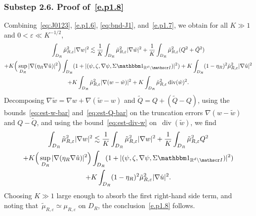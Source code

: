 \documentclass[JEP,XML,SOM,Unicode,published]{cedram}
\let\mathcal\mathscr
\let\mathds\mathbbm
\theoremstyle{plain}
\theoremstyle{definition}
\newcommand{\e}{\varepsilon}
\newcommand{\R}{\mathbb R}
\newcommand{\Ic}{\mathcal I}
\newcommand{\Div}{{\operatorname{div}}}
\newcommand{\substep}[1]{\subsubsection*{Substep #1}}
\begin{document}
\substep{2.6. Proof of~\eqref{e.p1.8}}
Combining~\eqref{eq:J0123}, \eqref{e.p1.6}, \eqref{eq:bnd-J1}, and~\eqref{e.p1.7}, we obtain for all $K\gg1$ and $0<\e\ll K^{-1/2}$,
\begin{multline*}
\int_{D_R} \tilde \mu_{R,\e}^2|\nabla w|^2
\lesssim \frac1K\int_{D_R}\tilde\mu_{R,\e}^2|\nabla\tilde w|^2
+\frac1K\int_{D_R}\tilde\mu_{R,\e}^2( Q^2+\tilde Q^2)\\
+K\Big(\sup_{D_R}|\nabla(\eta_R\nabla\hat u)|^2\Big)\int_{D_R}(1+|(\psi,\zeta,\nabla\psi,\Sigma\mathds1_{\R^d\setminus\Ic})|^2)
+K\int_{D_R}(1-\eta_R)^2\tilde\mu_{R,\e}^2|\nabla\hat u|^2\\
+K\int_{D_R} \tilde \mu_{R,\e}^2|\nabla(w-\tilde w)|^2
+K\int_{D_R} \tilde \mu_{R,\e}^2\,\Div(\tilde w)^2.
\end{multline*}
Decomposing $\nabla\tilde w=\nabla w+\nabla(\tilde w-w)$ and $\tilde Q=Q+(\tilde Q-Q)$, using the bounds~\eqref{eq:est-w-bar} and~\eqref{eq:est-Q-bar} on the truncation errors $\nabla(w-\tilde w)$ and $Q-\tilde Q$, and using the bound~\eqref{eq:est-div-w} on~$\Div(\tilde w)$, we find
\begin{multline*}
\int_{D_R} \tilde \mu_{R,\e}^2|\nabla w|^2
\lesssim \frac1K\int_{D_R}\tilde\mu_{R,\e}^2|\nabla w|^2
+\frac1K\int_{D_R}\tilde\mu_{R,\e}^2Q^2\\
+K\Big(\sup_{D_R}|\nabla(\eta_R\nabla\hat u)|^2\Big)\int_{D_R}(1+|(\psi,\zeta,\nabla\psi,\Sigma\mathds1_{\R^d\setminus\Ic})|^2)\\
+K\int_{D_R}(1-\eta_R)^2\tilde\mu_{R,\e}^2|\nabla\hat u|^2.
\end{multline*}
Choosing $K\gg1$ large enough to absorb the first right-hand side term, and noting that~$\tilde\mu_{R,\e}\simeq\mu_{R,\e}$ on $D_R$, the conclusion~\eqref{e.p1.8} follows.
\end{document}
